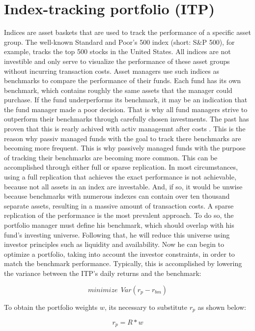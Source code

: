\documentclass[
  oneside]{book}
\begin{document}
\hypertarget{index-tracking-portfolio-itp}{%
\section{Index-tracking portfolio (ITP)}\label{index-tracking-portfolio-itp}}

Indices are asset baskets that are used to track the performance of a specific asset group. The well-known Standard and Poor's 500 index (short: S\&P 500), for example, tracks the top 500 stocks in the United States. All indices are not investible and only serve to visualize the performance of these asset groups without incurring transaction costs. Asset managers use such indices as benchmarks to compare the performance of their funds. Each fund has its own benchmark, which contains roughly the same assets that the manager could purchase. If the fund underperforms its benchmark, it may be an indication that the fund manager made a poor decision. That is why all fund managers strive to outperform their benchmarks through carefully chosen investments. The past has proven that this is rearly achived with activ managemnt after costs \citep{Desm2016}. This is the reason why passiv managed funds with the goal to track there benchmarks are becoming more frequent. This is why passively managed funds with the purpose of tracking their benchmarks are becoming more common. This can be accomplished through either full or sparse replication. In most circumstances, using a full replication that achieves the exact performance is not achievable, because not all assets in an index are investable. And, if so, it would be unwise because benchmarks with numerous indexes can contain over ten thousand separate assets, resulting in a massive amount of transaction costs. A sparse replication of the performance is the most prevalent approach. To do so, the portfolio manager must define his benchmark, which should overlap with his fund's investing universe. Following that, he will reduce this universe using investor principles such as liquidity and availability. Now he can begin to optimize a portfolio, taking into account the investor constraints, in order to match the benchmark performance. Typically, this is accomplished by lowering the variance between the ITP's daily returns and the benchmark:

\[
 minimize \ \ Var(r_{p}-r_{bm})
\]

To obtain the portfolio weights \(w\), its necessary to substitute \(r_{p}\) as shown below:

\[
  r_{p} = R * w
\]
\end{document}
